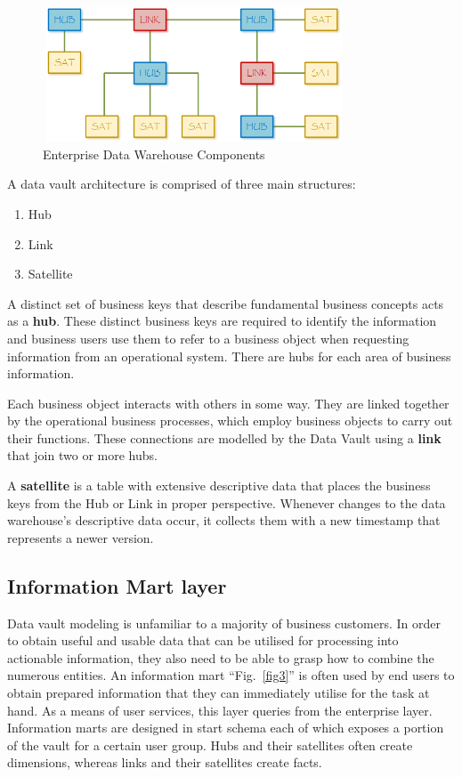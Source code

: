 \documentclass[conference]{IEEEtran}
\begin{document}
\begin{figure}[htbp]
\centerline{\includegraphics[width=9cm, height=4cm]{Figure2.png}}
\caption{Enterprise Data Warehouse Components}
\label{fig2}
\end{figure}

\smallskip
\noindent A data vault architecture is comprised of three main structures:

\begin{enumerate}
\item Hub
\item Link
\item Satellite
\end{enumerate}

A distinct set of business keys that describe fundamental business concepts acts as a \textbf{hub}. These distinct business keys are required to identify the information and business users use them to refer to a business object when requesting information from an operational system. There are hubs for each area of business information.

Each business object interacts with others in some way. They are linked together by the operational business processes, which employ business objects to carry out their functions. These connections are modelled by the Data Vault using a \textbf{link} that join two or more hubs.

A \textbf{satellite} is a table with extensive descriptive data that places the business keys from the Hub or Link in proper perspective. Whenever changes to the data warehouse's descriptive data occur, it collects them with a new timestamp that represents a newer version.

\subsection{Information Mart layer}

Data vault modeling is unfamiliar to a majority of business customers. In order to obtain useful and usable data that can be utilised for processing into actionable information, they also need to be able to grasp how to combine the numerous entities. An information mart ``Fig.~\ref{fig3}'' is often used by end users to obtain prepared information that they can immediately utilise for the task at hand. As a means of user services, this layer queries from the enterprise layer. Information marts are designed in start schema each of which exposes a portion of the vault for a certain user group. Hubs and their satellites often create dimensions, whereas links and their satellites create facts.
\end{document}

